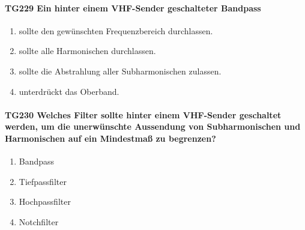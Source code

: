 \documentclass[8pt]{article}
\begin{document}
\paragraph*{TG229 Ein hinter einem VHF-Sender geschalteter Bandpass}
\begin{enumerate}[nolistsep,label=\Alph*]
\item sollte den gewünschten Frequenzbereich durchlassen.
\item sollte alle Harmonischen durchlassen.
\item sollte die Abstrahlung aller Subharmonischen zulassen.
\item unterdrückt das Oberband.
\end{enumerate}

\paragraph*{TG230 Welches Filter sollte hinter einem VHF-Sender geschaltet werden, um die unerwünschte Aussendung von Subharmonischen und Harmonischen auf ein Mindestmaß zu begrenzen?}
\begin{enumerate}[nolistsep,label=\Alph*]
\item Bandpass
\item Tiefpassfilter
\item Hochpassfilter
\item Notchfilter
\end{enumerate}
\end{document}

